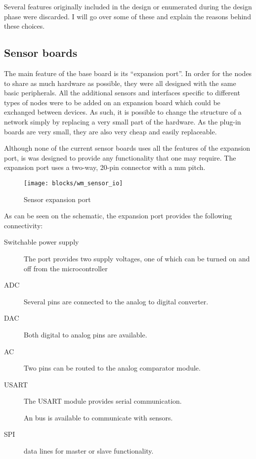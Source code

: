 Several features originally included in the design or enumerated during the
design phase were discarded. I will go over some of these and explain the
reasons behind these choices.


\subsection{Sensor boards}

The main feature of the base board is its ``expansion port''. In order for the
nodes to share as much hardware as possible, they were all designed with the
same basic peripherals. All the additional sensors and interfaces specific to
different types of nodes were to be added on an expansion board which could be
exchanged between devices. As such, it is possible to change the structure of a
network simply by replacing a very small part of the hardware. As the plug-in
boards are very small, they are also very cheap and easily replaceable.

Although none of the current sensor boards uses all the features of the
expansion port, is was designed to provide any functionality that one may
require. The expansion port uses a two-way, 20-pin connector with a \unit[2]{mm}
pitch.

\begin{figure}[hp]
  \begin{center}
    \texttt{[image: blocks/wm\_sensor\_io]}
  \end{center}
  \caption{Sensor expansion port}
  \label{fig:sensor-io}
\end{figure}

As can be seen on the schematic, the expansion port provides the following
connectivity:
\begin{description}
  \item [Switchable power supply] The port provides two supply voltages, one of
    which can be turned on and off from the microcontroller
  \item[ADC] Several pins are connected to the analog to digital converter.
  \item[DAC] Both digital to analog pins are available.
  \item[AC] Two pins can be routed to the analog comparator module.
  \item[USART] The USART module provides serial communication.
  \item[\IIC{}] An \IIC{} bus is available to communicate with sensors.
  \item[SPI] data lines for master or slave functionality.
\end{description}

